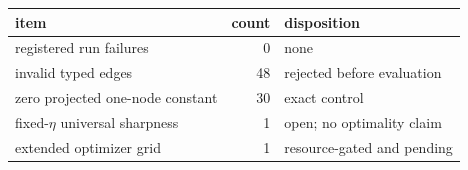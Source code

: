\begin{tabular}{@{}lrl@{}}
\toprule
item & count & disposition \\
\midrule
registered run failures & 0 & none \\ 
invalid typed edges & 48 & rejected before evaluation \\ 
zero projected one-node constant & 30 & exact control \\ 
fixed-$\eta$ universal sharpness & 1 & open; no optimality claim \\ 
extended optimizer grid & 1 & resource-gated and pending \\ 
\bottomrule
\end{tabular}
